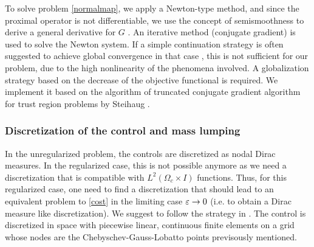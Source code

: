  To solve problem \eqref{normalmap}, we apply a Newton-type method, and since the proximal operator is not differentiable, we use the concept of semismoothness to derive a general derivative for $G$ \cite{ulbrich2002semismooth}. An iterative method (conjugate gradient) is used to solve the Newton system. If a simple continuation strategy is often suggested to achieve global convergence in that case \cite{herzog2012directional}, this is not sufficient for our problem, due to the high nonlinearity of the phenomena involved. A globalization strategy based on the decrease of the objective functional is required. We implement it based on the algorithm of truncated conjugate gradient algorithm for trust region problems by Steihaug \cite{pieperthesis,steihaug1983}.


\subsubsection{Discretization of the control and mass lumping}
In the unregularized problem, the controls are discretized as nodal Dirac measures. In the regularized case, this is not possible anymore as we need a discretization that is compatible with $L^2(\Omega_c \times I)$ functions. Thus, for this regularized case, one need to find a discretization that should lead to an equivalent problem to \eqref{cost} in the limiting case $\varepsilon \to 0$ (i.e. to obtain a Dirac measure like discretization). We suggest to follow the strategy in \cite{pieper2014}. The control is discretized in space with piecewise linear, continuous finite elements on a grid whose nodes are the Chebyschev-Gauss-Lobatto points previsously mentioned.

